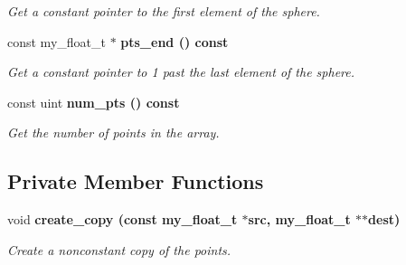 \begin{CompactItemize}
\begin{CompactList}\small\item\em Get a constant pointer to the first element of the sphere. \item\end{CompactList}\item 
const my\_\-float\_\-t $\ast$ \bf{pts\_\-end} () const \label{classSimSite3D_1_1DiscreteSphere_19c0f6e97d7235647271a5376dec43c6}

\begin{CompactList}\small\item\em Get a constant pointer to 1 past the last element of the sphere. \item\end{CompactList}\item 
const uint \bf{num\_\-pts} () const \label{classSimSite3D_1_1DiscreteSphere_f3062c3c256ce124eae95a440cd385d0}

\begin{CompactList}\small\item\em Get the number of points in the array. \item\end{CompactList}\end{CompactItemize}
\subsection*{Private Member Functions}
\begin{CompactItemize}
\item 
void \bf{create\_\-copy} (const my\_\-float\_\-t $\ast$src, my\_\-float\_\-t $\ast$$\ast$dest)\label{classSimSite3D_1_1DiscreteSphere_27a44b0af870362405f7ff812e909e02}

\begin{CompactList}\small\item\em Create a nonconstant copy of the points. \item\end{CompactList}\end{CompactItemize}
